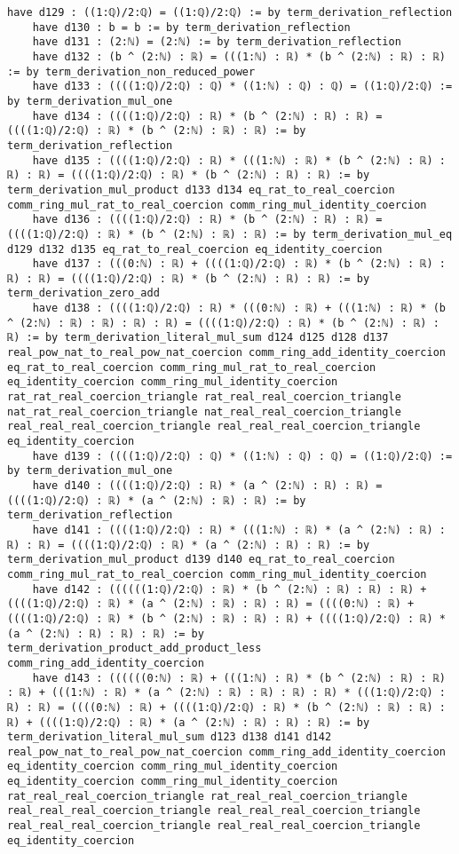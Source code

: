\documentclass{article}
\begin{document}
\begin{tcolorbox}[colback=white!10, width=\linewidth]
\begin{lstlisting}[language=Lean4]
    have d129 : ((1:ℚ)/2:ℚ) = ((1:ℚ)/2:ℚ) := by term_derivation_reflection
    have d130 : b = b := by term_derivation_reflection
    have d131 : (2:ℕ) = (2:ℕ) := by term_derivation_reflection
    have d132 : (b ^ (2:ℕ) : ℝ) = (((1:ℕ) : ℝ) * (b ^ (2:ℕ) : ℝ) : ℝ) := by term_derivation_non_reduced_power
    have d133 : ((((1:ℚ)/2:ℚ) : ℚ) * ((1:ℕ) : ℚ) : ℚ) = ((1:ℚ)/2:ℚ) := by term_derivation_mul_one
    have d134 : ((((1:ℚ)/2:ℚ) : ℝ) * (b ^ (2:ℕ) : ℝ) : ℝ) = ((((1:ℚ)/2:ℚ) : ℝ) * (b ^ (2:ℕ) : ℝ) : ℝ) := by term_derivation_reflection
    have d135 : ((((1:ℚ)/2:ℚ) : ℝ) * (((1:ℕ) : ℝ) * (b ^ (2:ℕ) : ℝ) : ℝ) : ℝ) = ((((1:ℚ)/2:ℚ) : ℝ) * (b ^ (2:ℕ) : ℝ) : ℝ) := by term_derivation_mul_product d133 d134 eq_rat_to_real_coercion comm_ring_mul_rat_to_real_coercion comm_ring_mul_identity_coercion
    have d136 : ((((1:ℚ)/2:ℚ) : ℝ) * (b ^ (2:ℕ) : ℝ) : ℝ) = ((((1:ℚ)/2:ℚ) : ℝ) * (b ^ (2:ℕ) : ℝ) : ℝ) := by term_derivation_mul_eq d129 d132 d135 eq_rat_to_real_coercion eq_identity_coercion
    have d137 : (((0:ℕ) : ℝ) + ((((1:ℚ)/2:ℚ) : ℝ) * (b ^ (2:ℕ) : ℝ) : ℝ) : ℝ) = ((((1:ℚ)/2:ℚ) : ℝ) * (b ^ (2:ℕ) : ℝ) : ℝ) := by term_derivation_zero_add
    have d138 : ((((1:ℚ)/2:ℚ) : ℝ) * (((0:ℕ) : ℝ) + (((1:ℕ) : ℝ) * (b ^ (2:ℕ) : ℝ) : ℝ) : ℝ) : ℝ) = ((((1:ℚ)/2:ℚ) : ℝ) * (b ^ (2:ℕ) : ℝ) : ℝ) := by term_derivation_literal_mul_sum d124 d125 d128 d137 real_pow_nat_to_real_pow_nat_coercion comm_ring_add_identity_coercion eq_rat_to_real_coercion comm_ring_mul_rat_to_real_coercion eq_identity_coercion comm_ring_mul_identity_coercion rat_rat_real_coercion_triangle rat_real_real_coercion_triangle nat_rat_real_coercion_triangle nat_real_real_coercion_triangle real_real_real_coercion_triangle real_real_real_coercion_triangle eq_identity_coercion
    have d139 : ((((1:ℚ)/2:ℚ) : ℚ) * ((1:ℕ) : ℚ) : ℚ) = ((1:ℚ)/2:ℚ) := by term_derivation_mul_one
    have d140 : ((((1:ℚ)/2:ℚ) : ℝ) * (a ^ (2:ℕ) : ℝ) : ℝ) = ((((1:ℚ)/2:ℚ) : ℝ) * (a ^ (2:ℕ) : ℝ) : ℝ) := by term_derivation_reflection
    have d141 : ((((1:ℚ)/2:ℚ) : ℝ) * (((1:ℕ) : ℝ) * (a ^ (2:ℕ) : ℝ) : ℝ) : ℝ) = ((((1:ℚ)/2:ℚ) : ℝ) * (a ^ (2:ℕ) : ℝ) : ℝ) := by term_derivation_mul_product d139 d140 eq_rat_to_real_coercion comm_ring_mul_rat_to_real_coercion comm_ring_mul_identity_coercion
    have d142 : ((((((1:ℚ)/2:ℚ) : ℝ) * (b ^ (2:ℕ) : ℝ) : ℝ) : ℝ) + ((((1:ℚ)/2:ℚ) : ℝ) * (a ^ (2:ℕ) : ℝ) : ℝ) : ℝ) = ((((0:ℕ) : ℝ) + ((((1:ℚ)/2:ℚ) : ℝ) * (b ^ (2:ℕ) : ℝ) : ℝ) : ℝ) + ((((1:ℚ)/2:ℚ) : ℝ) * (a ^ (2:ℕ) : ℝ) : ℝ) : ℝ) := by term_derivation_product_add_product_less comm_ring_add_identity_coercion
    have d143 : ((((((0:ℕ) : ℝ) + (((1:ℕ) : ℝ) * (b ^ (2:ℕ) : ℝ) : ℝ) : ℝ) + (((1:ℕ) : ℝ) * (a ^ (2:ℕ) : ℝ) : ℝ) : ℝ) : ℝ) * (((1:ℚ)/2:ℚ) : ℝ) : ℝ) = ((((0:ℕ) : ℝ) + ((((1:ℚ)/2:ℚ) : ℝ) * (b ^ (2:ℕ) : ℝ) : ℝ) : ℝ) + ((((1:ℚ)/2:ℚ) : ℝ) * (a ^ (2:ℕ) : ℝ) : ℝ) : ℝ) := by term_derivation_literal_mul_sum d123 d138 d141 d142 real_pow_nat_to_real_pow_nat_coercion comm_ring_add_identity_coercion eq_identity_coercion comm_ring_mul_identity_coercion eq_identity_coercion comm_ring_mul_identity_coercion rat_real_real_coercion_triangle rat_real_real_coercion_triangle real_real_real_coercion_triangle real_real_real_coercion_triangle real_real_real_coercion_triangle real_real_real_coercion_triangle eq_identity_coercion

\end{lstlisting}
\end{tcolorbox}
\end{document}
